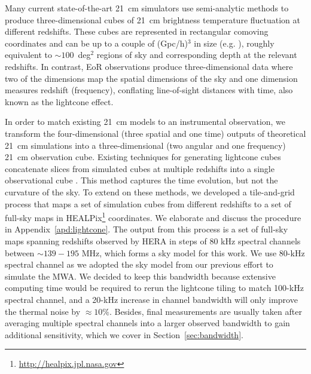 \documentclass[fleqn,usenatbib]{mnras}
\begin{document}
Many current state-of-the-art 21~cm simulators use semi-analytic methods to produce three-dimensional cubes of 21~cm brightness temperature fluctuation at different redshifts. These cubes are represented in rectangular comoving coordinates and can be up to a couple of (Gpc/h)$^3$ in size (e.g. \citet{2011MNRAS.411..955M}), roughly equivalent to $\sim100$~deg$^2$ regions of sky and corresponding depth at the relevant redshifts. In contrast, EoR observations produce three-dimensional data where two of the dimensions map the spatial dimensions of the sky and one dimension measures redshift (frequency), conflating line-of-sight distances with time, also known as the lightcone effect.

In order to match existing 21~cm models to an instrumental observation, we transform the four-dimensional (three spatial and one time) outputs of theoretical 21~cm simulations into a three-dimensional (two angular and one frequency) 21~cm observation cube. Existing techniques for generating lightcone cubes concatenate slices from simulated cubes at multiple redshifts into a single observational cube \citep{2012MNRAS.424.1877D, 2014MNRAS.442.1491D, 2014MNRAS.439.1615Z}. This method captures the time evolution, but not the curvature of the sky. To extend on these methods, we developed a tile-and-grid process that maps a set of simulation cubes from different redshifts to a set of full-sky maps in HEALPix\footnote{\url{http://healpix.jpl.nasa.gov}} coordinates. We elaborate and discuss the procedure in Appendix~\ref{apd:lightcone}. The output from this process is a set of full-sky maps spanning redshifts observed by HERA in steps of 80 kHz spectral channels between $\sim139-195$ MHz, which forms a sky model for this work. We use 80-kHz spectral channel as we adopted the sky model from our previous effort to simulate the MWA. We decided to keep this bandwidth because extensive computing time would be required to rerun the lightcone tiling to match 100-kHz spectral channel, and a 20-kHz increase in channel bandwidth will only improve the thermal noise by $\approx10\%$. Besides, final measurements are usually taken after averaging multiple spectral channels into a larger observed bandwidth to gain additional sensitivity, which we cover in Section~\ref{sec:bandwidth}. 

\end{document}
